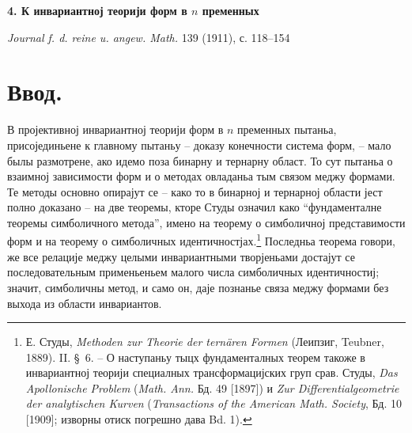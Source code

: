 \documentclass[11pt]{article}
\begin{document}
\begin{center}
{\Large\bfseries 4. К инвариантној теорији форм в $n$ пременных}\par
\vspace{1.2em}
\emph{Journal f. d. reine u. angew. Math.} 139 (1911), с. 118--154
\end{center}

\section*{Ввод.}
В пројективној инвариантној теорији форм в $n$ пременных пытаньа, присојединьене к главному пытаньу -- доказу конечности система форм, -- мало былы размотрене, ако идемо поза бинарну и тернарну област. То сут пытаньа о взаимној зависимости форм и о методах овладаньа тым связом меджу формами. Те методы основно опирајут се -- како то в бинарној и тернарној области јест полно доказано -- на две теоремы, кторе Студы означил како ``фундаменталне теоремы симболичного метода'', имено на теорему о симболичној представимости форм и на теорему о симболичных идентичностјах.\footnote{Е. Студы, \emph{Methoden zur Theorie der ternären Formen} (Леипзиг, Teubner, 1889). II. \S\ 6. -- О наступаньу тыцх фундаменталных теорем такоже в инвариантној теорији специалных трансформацијских груп срав. Студы, \emph{Das Apollonische Problem} (\emph{Math. Ann.} Бд. 49 [1897]) и \emph{Zur Differentialgeometrie der analytischen Kurven} (\emph{Transactions of the American Math. Society}, Бд. 10 [1909]; изворны отиск погрешно дава Bd. 1).} Последньа теорема говори, же все релације меджу целыми инвариантными творјеньами достајут се последовательным применьеньем малого числа симболичных идентичностиј; значит, симболичны метод, и само он, даје познанье связа меджу формами без выхода из области инвариантов.
\end{document}
